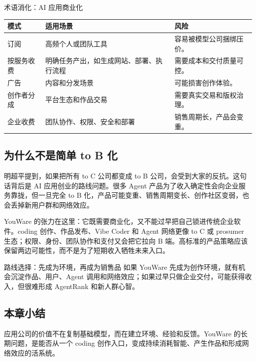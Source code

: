 \begin{knowledgebox}{术语消化：AI 应用商业化}
\noindent\begin{tabularx}{\textwidth}{p{}p{}X}
\toprule
模式 & 适用场景 & 风险 \\
\midrule
订阅 & 高频个人或团队工具 & 容易被模型公司捆绑压价。 \\
按服务收费 & 明确任务产出，如生成网站、部署、执行流程 & 需要成本和交付质量可控。 \\
广告 & 内容和分发场景 & 可能损害创作体验。 \\
创作者分成 & 平台生态和作品交易 & 需要真实交易和版权治理。 \\
企业收费 & 团队协作、权限、安全和部署 & 销售周期长，产品会变重。 \\
\bottomrule
\end{tabularx}
\end{knowledgebox}

\subsection{为什么不是简单 to B 化}

明超平提到，如果把所有 to C 公司都变成 to B 公司，会受到大家的反抗。这句话背后是 AI 应用创业的路线问题。很多 Agent 产品为了收入确定性会向企业服务靠拢，但一旦完全 to B 化，产品可能变重、销售周期变长、创作社区变弱，也会丢掉新用户群和网络效应。

YouWare 的张力在这里：它既需要商业化，又不能过早把自己锁进传统企业软件。coding 创作、作品发布、Vibe Coder 和 Agent 网络更像 to C 或 prosumer 生态；权限、身份、团队协作和支付又会把它拉向 B 端。高标准的产品策略应该保留两边可能性，而不是为了短期收入牺牲未来入口。

\begin{importantbox}{路线选择：先成为环境，再成为销售品}
如果 YouWare 先成为创作环境，就有机会沉淀作品、用户、Agent 调用和网络效应；如果过早只做企业交付，可能获得收入，但很难形成 AgentRank 和新人群心智。
\end{importantbox}

\subsection{本章小结}

应用公司的价值不在复制基础模型，而在建立环境、经验和反馈。YouWare 的长期问题，是能否从一个 coding 创作入口，变成持续消耗智能、产生作品和形成网络效应的活系统。

